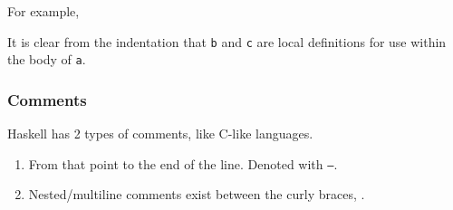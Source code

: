 For example,
\begin{listing}[h!tbp]
\end{listing}

It is clear from the indentation that \texttt{b} and \texttt{c} are local definitions for use within the body of \texttt{a}.

\subsubsection{Comments}\label{subsubsec:Comments}
Haskell has 2 types of comments, like C-like languages.
\begin{enumerate}[noitemsep]
\item From that point to the end of the line.
  Denoted with \texttt{--}.
\item Nested/multiline comments exist between the curly braces, .
\end{enumerate}

